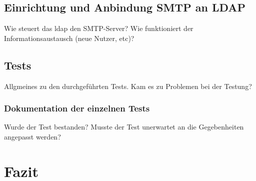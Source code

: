 \section{Einrichtung und Anbindung SMTP an LDAP}
Wie steuert das \ac{ldap} den SMTP-Server? Wie funktioniert der Informationsaustausch (neue Nutzer, etc)?

\section{Tests}
Allgmeines zu den durchgeführten Tests. Kam es zu Problemen bei der Testung?
\subsection{Dokumentation der einzelnen Tests}
Wurde der Test bestanden? Musste der Test unerwartet an die Gegebenheiten angepasst werden?

\chapter{Fazit}
\label{sec:Fazit}

\blindtext


